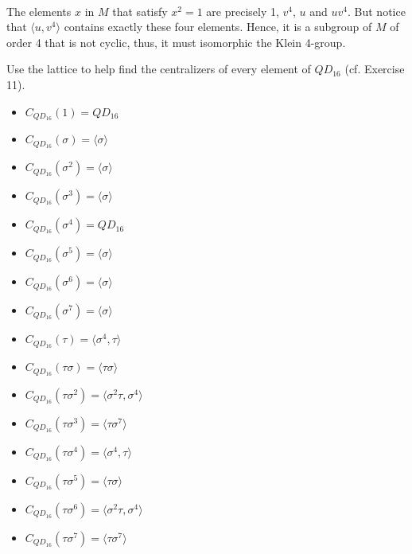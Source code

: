\begin{solution}
    \\ The elements $x$ in $M$ that satisfy $x^2 = 1$ are precisely 1, $v^4$, $u$ and $uv^4$. But notice that $\langle u, v^4 \rangle$ contains exactly these four elements. Hence, it is a subgroup of $M$ of order 4 that is not cyclic, thus, it must isomorphic the Klein 4-group. \\ 
\end{solution}

\begin{exercise}
    Use the lattice to help find the centralizers of every element of $QD_{16}$ (cf. Exercise 11). \\
\end{exercise}

\begin{solution}
    \begin{multicols}{2}\begin{itemize}
        \item $C_{QD_{16}}(1) = QD_{16}$
        \item $C_{QD_{16}}(\sigma) = \langle \sigma \rangle$
        \item $C_{QD_{16}}(\sigma^2) = \langle \sigma \rangle$
        \item $C_{QD_{16}}(\sigma^3) = \langle \sigma \rangle$
        \item $C_{QD_{16}}(\sigma^4) = QD_{16}$
        \item $C_{QD_{16}}(\sigma^5) = \langle \sigma \rangle$
        \item $C_{QD_{16}}(\sigma^6) = \langle \sigma \rangle$
        \item $C_{QD_{16}}(\sigma^7) = \langle \sigma \rangle$
        \item $C_{QD_{16}}(\tau) = \langle \sigma^4, \tau \rangle$
        \item $C_{QD_{16}}(\tau\sigma) = \langle \tau\sigma \rangle$
        \item $C_{QD_{16}}(\tau\sigma^2) = \langle \sigma^2\tau, \sigma^4 \rangle$
        \item $C_{QD_{16}}(\tau\sigma^3) = \langle \tau \sigma^7 \rangle$
        \item $C_{QD_{16}}(\tau\sigma^4) = \langle \sigma^4, \tau \rangle$
        \item $C_{QD_{16}}(\tau\sigma^5) = \langle \tau\sigma \rangle$
        \item $C_{QD_{16}}(\tau\sigma^6) = \langle \sigma^2\tau, \sigma^4 \rangle$
        \item $C_{QD_{16}}(\tau\sigma^7) = \langle \tau\sigma^7 \rangle$
    \end{itemize}
    \end{multicols}
\end{solution}

